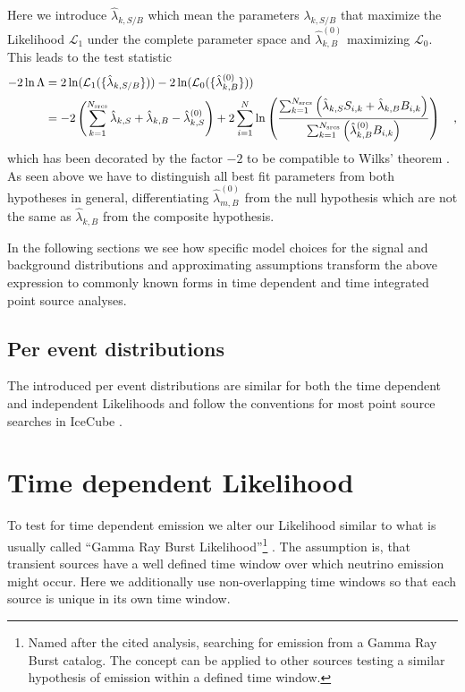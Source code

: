 Here we introduce $\hat{\lambda}_{k,S/B}$ which mean the parameters $\lambda_{k,S/B}$ that maximize the Likelihood $\mathcal{L}_1$ under the complete parameter space and $\hat{\lambda}_{k,B}^{(0)}$ maximizing $\mathcal{L}_0$.
This leads to the test statistic
\begin{align}
  -2\ln\Lambda
  &= 2\ln(\mathcal{L}_1(\{\hat{\lambda}_{k,S/B}\})) -
     2\ln(\mathcal{L}_0(\{\hat{\lambda}^{(0)}_{k,B}\})) \\
  &= -2\left(\sum_{k=1}^{N_\text{srcs}}\hat{\lambda}_{k,S} +
                                       \hat{\lambda}_{k,B} -
                                       \hat{\lambda}_{k,S}^{(0)}\right) +
    2\sum_{i=1}^N \ln\left(
      \frac{\sum_{k=1}^{N_\text{srcs}}\left(
          \hat{\lambda}_{k,S} S_{i,k}+\hat{\lambda}_{k,B} B_{i,k}\right)}
          {\sum_{k=1}^{N_\text{srcs}}\left(
            \hat{\lambda}_{k,B}^{(0)} B_{i,k}
          \right)}
        \right)
  \quad\text{,}
\end{align}
which has been decorated by the factor $-2$ to be compatible to Wilks' theorem .
As seen above we have to distinguish all best fit parameters from both hypotheses in general, differentiating $\hat{\lambda}_{m,B}^{(0)}$ from the null hypothesis which are not the same as $\hat{\lambda}_{k,B}$ from the composite hypothesis.

In the following sections we see how specific model choices for the signal and background distributions and approximating assumptions transform the above expression to commonly known forms in time dependent and time integrated point source analyses.

\subsection{Per event distributions}
The introduced per event distributions are similar for both the time dependent and independent Likelihoods and follow the conventions for most point source searches in IceCube .




\section{Time dependent Likelihood}
To test for time dependent emission we alter our Likelihood similar to what is usually called \enquote{Gamma Ray Burst Likelihood}\footnote{Named after the cited analysis, searching for emission from a Gamma Ray Burst catalog. The concept can be applied to other sources testing a similar hypothesis of emission within a defined time window.} .
The assumption is, that transient sources have a well defined time window over which neutrino emission might occur.
Here we additionally use non-overlapping time windows so that each source is unique in its own time window.

